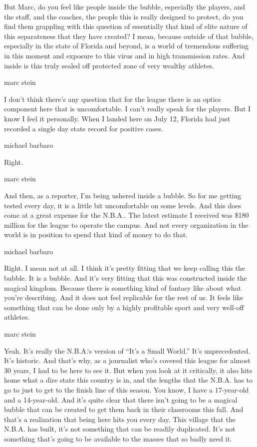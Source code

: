 But Marc, do you feel like people inside the bubble, especially the
players, and the staff, and the coaches, the people this is really
designed to protect, do you find them grappling with this question of
essentially that kind of elite nature of this separateness that they
have created? I mean, because outside of that bubble, especially in the
state of Florida and beyond, is a world of tremendous suffering in this
moment and exposure to this virus and in high transmission rates. And
inside is this truly sealed off protected zone of very wealthy athletes.

marc stein

I don't think there's any question that for the league there is an
optics component here that is uncomfortable. I can't really speak for
the players. But I know I feel it personally. When I landed here on July
12, Florida had just recorded a single day state record for positive
cases.

michael barbaro

Right.

marc stein

And then, as a reporter, I'm being ushered inside a bubble. So for me
getting tested every day, it is a little bit uncomfortable on some
levels. And this does come at a great expense for the N.B.A.. The latest
estimate I received was \$180 million for the league to operate the
campus. And not every organization in the world is in position to spend
that kind of money to do that.

michael barbaro

Right. I mean not at all. I think it's pretty fitting that we keep
calling this the bubble. It is a bubble. And it's very fitting that this
was constructed inside the magical kingdom. Because there is something
kind of fantasy like about what you're describing. And it does not feel
replicable for the rest of us. It feels like something that can be done
only by a highly profitable sport and very well-off athletes.

marc stein

Yeah. It's really the N.B.A.`s version of ``It's a Small World.'' It's
unprecedented. It's historic. And that's why, as a journalist who's
covered this league for almost 30 years, I had to be here to see it. But
when you look at it critically, it also hits home what a dire state this
country is in, and the lengths that the N.B.A. has to go to just to get
to the finish line of this season. You know, I have a 17-year-old and a
14-year-old. And it's quite clear that there isn't going to be a magical
bubble that can be created to get them back in their classrooms this
fall. And that's a realization that being here hits you every day. This
village that the N.B.A. has built, it's not something that can be
readily duplicated. It's not something that's going to be available to
the masses that so badly need it.

